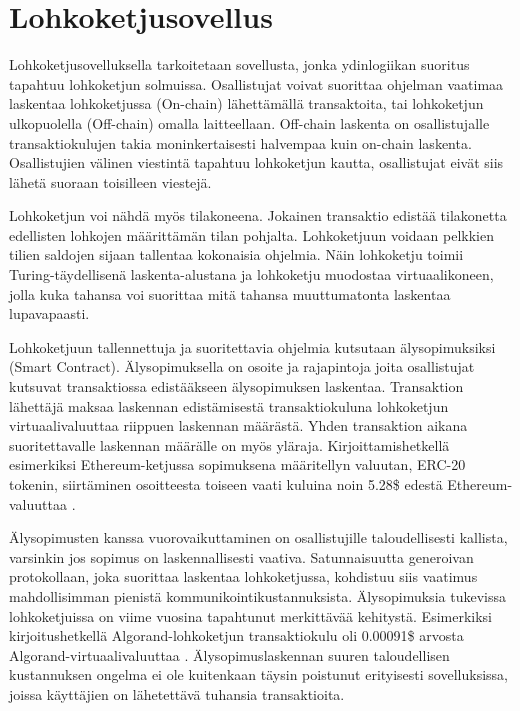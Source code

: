 \section{Lohkoketjusovellus}

Lohkoketjusovelluksella tarkoitetaan sovellusta, jonka ydinlogiikan suoritus tapahtuu lohkoketjun solmuissa. Osallistujat voivat suorittaa ohjelman vaatimaa laskentaa lohkoketjussa (On-chain) lähettämällä transaktoita, tai lohkoketjun ulkopuolella (Off-chain) omalla laitteellaan. Off-chain laskenta on osallistujalle transaktiokulujen takia moninkertaisesti halvempaa kuin on-chain laskenta. Osallistujien välinen viestintä tapahtuu lohkoketjun kautta, osallistujat eivät siis lähetä suoraan toisilleen viestejä.

Lohkoketjun voi nähdä myös tilakoneena. Jokainen transaktio edistää tilakonetta edellisten lohkojen määrittämän tilan pohjalta. Lohkoketjuun voidaan pelkkien tilien saldojen sijaan tallentaa kokonaisia ohjelmia. Näin lohkoketju toimii Turing-täydellisenä laskenta-alustana ja lohkoketju muodostaa virtuaalikoneen, jolla kuka tahansa voi suorittaa mitä tahansa muuttumatonta laskentaa lupavapaasti.

Lohkoketjuun tallennettuja ja suoritettavia ohjelmia kutsutaan älysopimuksiksi (Smart Contract).  Älysopimuksella on osoite ja rajapintoja joita osallistujat kutsuvat transaktiossa edistääkseen älysopimuksen laskentaa. Transaktion lähettäjä maksaa laskennan edistämisestä transaktiokuluna lohkoketjun virtuaalivaluuttaa riippuen laskennan määrästä. Yhden transaktion aikana suoritettavalle laskennan määrälle on myös yläraja. Kirjoittamishetkellä esimerkiksi Ethereum-ketjussa sopimuksena määritellyn valuutan, ERC-20 tokenin, siirtäminen osoitteesta toiseen vaati kuluina noin 5.28\$ edestä Ethereum-valuuttaa \cite{etherscanio_ethereum_nodate}.

Älysopimusten kanssa vuorovaikuttaminen on osallistujille taloudellisesti kallista, varsinkin jos sopimus on laskennallisesti vaativa. Satunnaisuutta generoivan protokollaan, joka suorittaa laskentaa lohkoketjussa, kohdistuu siis vaatimus mahdollisimman pienistä kommunikointikustannuksista. Älysopimuksia tukevissa lohkoketjuissa on viime vuosina tapahtunut merkittävää kehitystä. Esimerkiksi kirjoitushetkellä Algorand-lohkoketjun transaktiokulu oli 0.00091\$ arvosta Algorand-virtuaalivaluuttaa \cite{noauthor_algorand_nodate}. Älysopimuslaskennan suuren taloudellisen kustannuksen ongelma ei ole kuitenkaan täysin poistunut erityisesti sovelluksissa, joissa käyttäjien on lähetettävä tuhansia transaktioita.

